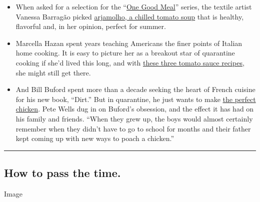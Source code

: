 \begin{itemize}
\item
  When asked for a selection for the
  ``\href{https://www.nytimes.com/column/one-good-meal?module=inline}{One
  Good Meal}'' series, the textile artist Vanessa Barragão picked
  \href{https://www.nytimes.com/2020/07/17/t-magazine/summer-recipes-arjamolho-soup-vanessa-barragao.html}{arjamolho,
  a chilled tomato soup} that is healthy, flavorful and, in her opinion,
  perfect for summer.
\item
  Marcella Hazan spent years teaching Americans the finer points of
  Italian home cooking. It is easy to picture her as a breakout star of
  quarantine cooking if she'd lived this long, and with
  \href{https://www.nytimes.com/2020/07/20/dining/marcella-hazan-tomato-sauce-recipe.html}{these
  three tomato sauce recipes}, she might still get there.
\item
  And Bill Buford spent more than a decade seeking the heart of French
  cuisine for his new book, ``Dirt.'' But in quarantine, he just wants
  to make
  \href{https://www.nytimes.com/2020/07/21/dining/bill-buford-dirt-book-chicken-recipe.html}{the
  perfect chicken}. Pete Wells dug in on Buford's obsession, and the
  effect it has had on his family and friends. ``When they grew up, the
  boys would almost certainly remember when they didn't have to go to
  school for months and their father kept coming up with new ways to
  poach a chicken.''
\end{itemize}

\begin{center}\rule{0.5\linewidth}{\linethickness}\end{center}

\hypertarget{how-to-pass-the-time}{%
\subsection{How to pass the time.}\label{how-to-pass-the-time}}

Image

